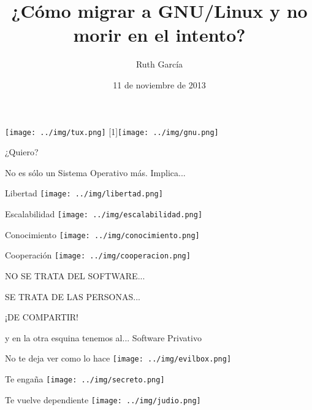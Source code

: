 \documentclass[xcolor=dvipsnames, pdf]{beamer}
\title[Migrando a GNU/Linux]{¿Cómo migrar a GNU/Linux y no morir en el intento?}
\author[VengadoraVG]{Ruth García}
\date[Noviemebre, 2013]{11 de noviembre de 2013}
\begin{document}
\begin{section}
  {}  
  \begin{frame}[clean]
    \titlepage
    \texttt{[image: ../img/tux.png]}\hfill 
    \scalebox{-1}[1]{\texttt{[image: ../img/gnu.png]}}
  \end{frame}
\end{section}

\begin{section}
  {¿Quiero?}
  
  \begin{subsection}
    {No es sólo un Sistema Operativo más. Implica...}
    \begin{frame}
      {Libertad}
      \texttt{[image: ../img/libertad.png]}
    \end{frame}
    
    \begin{frame}
      {Escalabilidad}
      \texttt{[image: ../img/escalabilidad.png]}
    \end{frame}
    
    \begin{frame}
      {Conocimiento}
      \texttt{[image: ../img/conocimiento.png]}
    \end{frame}
    
    \begin{frame}
      {Cooperación}
      \texttt{[image: ../img/cooperacion.png]}
    \end{frame}
  \end{subsection}
  
  \begin{frame}
    \vfill
    NO SE TRATA DEL SOFTWARE...  
    \begin{center} SE TRATA DE LAS PERSONAS... \end{center}
    \hfill ¡DE COMPARTIR!
    \vfill
  \end{frame}
  
  \begin{subsection}
    {y en la otra esquina tenemos al... Software Privativo}
    
    \begin{frame}
      {No te deja ver como lo hace}
      \texttt{[image: ../img/evilbox.png]}
    \end{frame}

    \begin{frame}
      {Te enga\~{n}a}
      \texttt{[image: ../img/secreto.png]}
    \end{frame}

    \begin{frame}
      {Te vuelve dependiente}
      \texttt{[image: ../img/judio.png]}
    \end{frame}
  \end{subsection}
\end{section}
\end{document}
